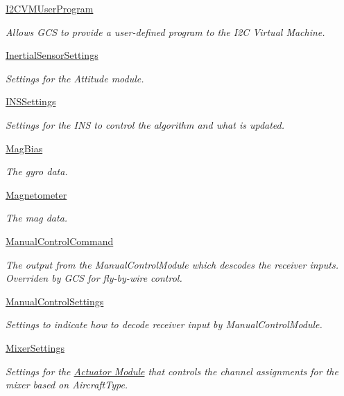 \begin{DoxyCompactItemize}
\hyperlink{group___i2_c_v_m_user_program}{\-I2\-C\-V\-M\-User\-Program}
\begin{DoxyCompactList}\small\item\em \-Allows \-G\-C\-S to provide a user-\/defined program to the \-I2\-C \-Virtual \-Machine. \end{DoxyCompactList}\item 
\hyperlink{group___inertial_sensor_settings}{\-Inertial\-Sensor\-Settings}
\begin{DoxyCompactList}\small\item\em \-Settings for the \-Attitude module. \end{DoxyCompactList}\item 
\hyperlink{group___i_n_s_settings}{\-I\-N\-S\-Settings}
\begin{DoxyCompactList}\small\item\em \-Settings for the \-I\-N\-S to control the algorithm and what is updated. \end{DoxyCompactList}\item 
\hyperlink{group___mag_bias}{\-Mag\-Bias}
\begin{DoxyCompactList}\small\item\em \-The gyro data. \end{DoxyCompactList}\item 
\hyperlink{group___magnetometer}{\-Magnetometer}
\begin{DoxyCompactList}\small\item\em \-The mag data. \end{DoxyCompactList}\item 
\hyperlink{group___manual_control_command}{\-Manual\-Control\-Command}
\begin{DoxyCompactList}\small\item\em \-The output from the \-Manual\-Control\-Module which descodes the receiver inputs. \-Overriden by \-G\-C\-S for fly-\/by-\/wire control. \end{DoxyCompactList}\item 
\hyperlink{group___manual_control_settings}{\-Manual\-Control\-Settings}
\begin{DoxyCompactList}\small\item\em \-Settings to indicate how to decode receiver input by \-Manual\-Control\-Module. \end{DoxyCompactList}\item 
\hyperlink{group___mixer_settings}{\-Mixer\-Settings}
\begin{DoxyCompactList}\small\item\em \-Settings for the \hyperlink{group___actuator_module}{\-Actuator \-Module} that controls the channel assignments for the mixer based on \-Aircraft\-Type. \end{DoxyCompactList}\item 

\end{DoxyCompactItemize}
